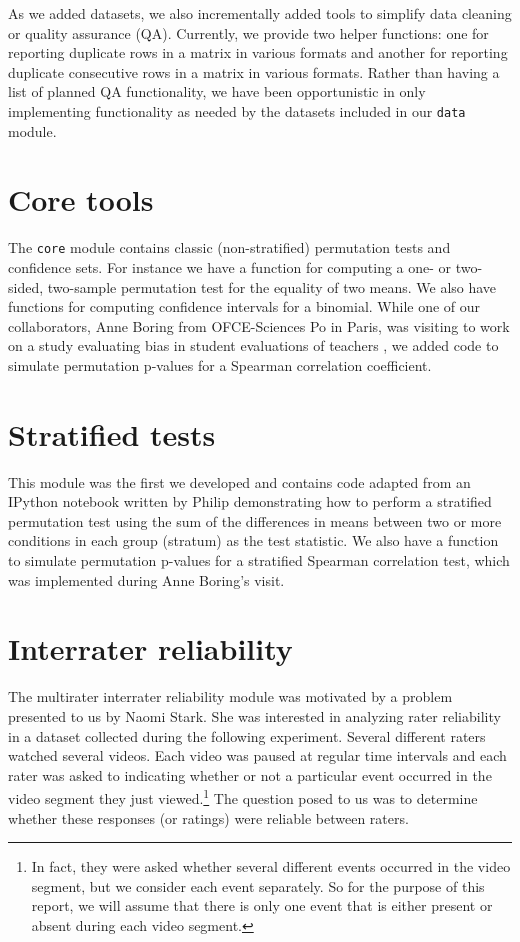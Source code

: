 As we added datasets, we also incrementally added tools to simplify data
cleaning or quality assurance (QA).  Currently, we provide two helper
functions: one for reporting duplicate rows in a matrix in various formats and
another for reporting duplicate consecutive rows in a matrix in various
formats.  Rather than having a list of planned QA functionality, we have been
opportunistic in only implementing functionality as needed by the datasets
included in our \texttt{data} module.

\section{Core tools}

The \texttt{core} module contains classic (non-stratified) permutation tests
and confidence sets.  For instance we have a function for computing a one- or
two-sided, two-sample permutation test for the equality of two means.  We also
have functions for computing confidence intervals for a binomial.
While one of our collaborators, Anne Boring from OFCE-Sciences Po in Paris, was
visiting to work on a study evaluating bias in student evaluations of teachers
\cite{boring2015}, we added code to simulate permutation p-values for a Spearman
correlation coefficient.

\section{Stratified tests}

This module was the first we developed and contains code adapted from an
IPython notebook written by Philip demonstrating how to perform a stratified
permutation test using the sum of the differences in means between two or more
conditions in each group (stratum) as the test statistic.
We also have a function to simulate permutation p-values for a stratified
Spearman correlation test, which was implemented during Anne Boring's visit.

\section{\label{sec:irr}Interrater reliability}

The multirater interrater reliability module was motivated by a problem
presented to us by Naomi Stark.  She was interested in analyzing rater
reliability in a dataset collected during the following experiment.  Several
different raters watched several videos.  Each video was paused at regular time
intervals and each rater was asked to indicating whether or not a particular
event occurred in the video segment they just viewed.\footnote{In fact, they
were asked whether several different events occurred in the video segment, but
we consider each event separately.  So for the purpose of this report, we will
assume that there is only one event that is either present or absent during
each video segment.} The question posed to us was to determine whether these
responses (or ratings) were reliable between raters. 

